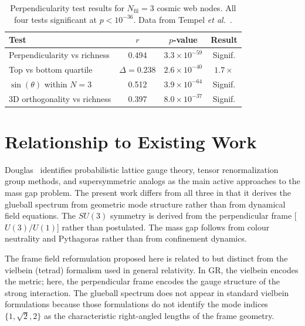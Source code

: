 \documentclass[aps,prd,twocolumn,superscriptaddress,nofootinbib]{revtex4-2}
\begin{document}
\begin{table}[t]
\caption{Perpendicularity test results for $N_{\text{fil}} = 3$
cosmic web nodes. All four tests significant at $p < 10^{-36}$.
Data from Tempel \textit{et al.}~\cite{Tempel2014}.}
\label{tab:perptest}
\begin{ruledtabular}
\begin{tabular}{lccc}
Test & $r$ & $p$-value & Result \\
\hline
Perpendicularity vs richness & 0.494 & $3.3\times10^{-59}$ & Signif. \\
Top vs bottom quartile       & $\Delta=0.238$ & $2.6\times10^{-40}$ & $1.7\times$ \\
$\sin(\theta)$ within $N=3$  & 0.512 & $3.9\times10^{-64}$ & Signif. \\
3D orthogonality vs richness & 0.397 & $8.0\times10^{-37}$ & Signif. \\
\end{tabular}
\end{ruledtabular}
\end{table}

\section{Relationship to Existing Work}
\label{sec:existing}

Douglas~\cite{Douglas2026} identifies probabilistic lattice gauge
theory, tensor renormalization group methods, and supersymmetric
analogs as the main active approaches to the mass gap problem. The
present work differs from all three in that it derives the glueball
spectrum from geometric mode structure rather than from dynamical
field equations. The $SU(3)$ symmetry is derived from the
perpendicular frame [$U(3)/U(1)$] rather than postulated. The mass
gap follows from colour neutrality and Pythagoras rather than from
confinement dynamics.

The frame field reformulation proposed here is related to but distinct
from the vielbein (tetrad) formalism used in general relativity. In
GR, the vielbein encodes the metric; here, the perpendicular frame
encodes the gauge structure of the strong interaction. The glueball
spectrum does not appear in standard vielbein formulations because
those formulations do not identify the mode indices
$\{1, \sqrt{2}, 2\}$ as the characteristic right-angled lengths of
the frame geometry.

\end{document}
